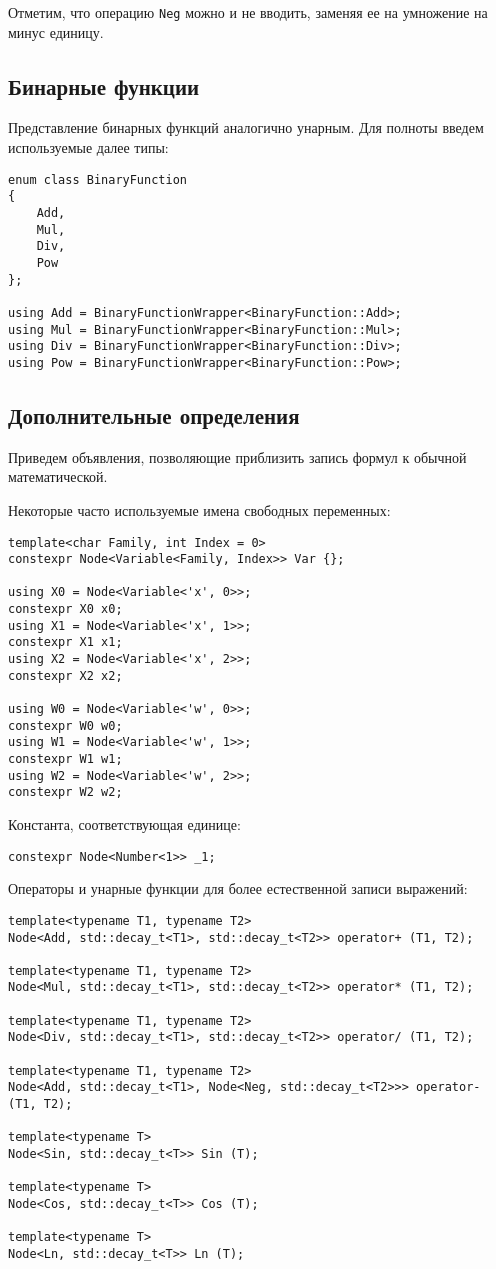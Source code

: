 \documentclass[11pt,a4paper]{article}
\begin{document}
Отметим, что операцию \texttt{Neg} можно и не вводить, заменяя ее на умножение на
минус единицу.

\subsection{Бинарные функции}

Представление бинарных функций аналогично унарным. Для полноты введем используемые далее
типы:
\begin{lstlisting}
enum class BinaryFunction
{
	Add,
	Mul,
	Div,
	Pow
};

using Add = BinaryFunctionWrapper<BinaryFunction::Add>;
using Mul = BinaryFunctionWrapper<BinaryFunction::Mul>;
using Div = BinaryFunctionWrapper<BinaryFunction::Div>;
using Pow = BinaryFunctionWrapper<BinaryFunction::Pow>;
\end{lstlisting}

\subsection{Дополнительные определения}

Приведем объявления, позволяющие приблизить запись формул к обычной математической.

Некоторые часто используемые имена свободных переменных:
\begin{lstlisting}
template<char Family, int Index = 0>
constexpr Node<Variable<Family, Index>> Var {};

using X0 = Node<Variable<'x', 0>>;
constexpr X0 x0;
using X1 = Node<Variable<'x', 1>>;
constexpr X1 x1;
using X2 = Node<Variable<'x', 2>>;
constexpr X2 x2;

using W0 = Node<Variable<'w', 0>>;
constexpr W0 w0;
using W1 = Node<Variable<'w', 1>>;
constexpr W1 w1;
using W2 = Node<Variable<'w', 2>>;
constexpr W2 w2;
\end{lstlisting}

Константа, соответствующая единице:
\begin{lstlisting}
constexpr Node<Number<1>> _1;
\end{lstlisting}

Операторы и унарные функции для более естественной записи выражений:
\begin{lstlisting}
template<typename T1, typename T2>
Node<Add, std::decay_t<T1>, std::decay_t<T2>> operator+ (T1, T2);

template<typename T1, typename T2>
Node<Mul, std::decay_t<T1>, std::decay_t<T2>> operator* (T1, T2);

template<typename T1, typename T2>
Node<Div, std::decay_t<T1>, std::decay_t<T2>> operator/ (T1, T2);

template<typename T1, typename T2>
Node<Add, std::decay_t<T1>, Node<Neg, std::decay_t<T2>>> operator- (T1, T2);

template<typename T>
Node<Sin, std::decay_t<T>> Sin (T);

template<typename T>
Node<Cos, std::decay_t<T>> Cos (T);

template<typename T>
Node<Ln, std::decay_t<T>> Ln (T);
\end{lstlisting}
\end{document}
